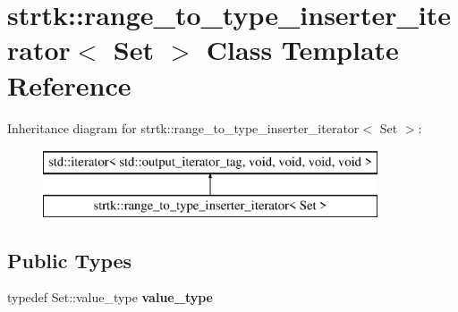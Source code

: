 \hypertarget{classstrtk_1_1range__to__type__inserter__iterator}{\section{strtk\-:\-:range\-\_\-to\-\_\-type\-\_\-inserter\-\_\-iterator$<$ Set $>$ Class Template Reference}
\label{classstrtk_1_1range__to__type__inserter__iterator}
}
Inheritance diagram for strtk\-:\-:range\-\_\-to\-\_\-type\-\_\-inserter\-\_\-iterator$<$ Set $>$\-:\begin{figure}[H]
\begin{center}
\leavevmode
\includegraphics[height=2.000000cm]{classstrtk_1_1range__to__type__inserter__iterator}
\end{center}
\end{figure}
\subsection*{Public Types}
\begin{DoxyCompactItemize}
\item 
\hypertarget{classstrtk_1_1range__to__type__inserter__iterator_ab99a3748a8a9d1c9ae6b9f2fb3b4d094}{typedef Set\-::value\-\_\-type {\bfseries value\-\_\-type}}\label{classstrtk_1_1range__to__type__inserter__iterator_ab99a3748a8a9d1c9ae6b9f2fb3b4d094}

\end{DoxyCompactItemize}
